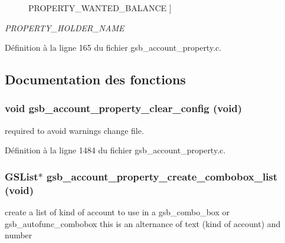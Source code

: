 \begin{Desc}
\begin{description}
{PROPERTY\_\-WANTED\_\-BALANCE\label{gsb__account__property_8c_a06dbc3a3eb5aaab80edf32ea607f1ef3a07534083ef68b1ae406ae1cfb89716d1}
}]\item[{\em 
PROPERTY\_\-HOLDER\_\-NAME\label{gsb__account__property_8c_a06dbc3a3eb5aaab80edf32ea607f1ef3a13a654144ba76dc39a1e14a1541b31f3}
}]\end{description}
\end{Desc}



Définition à la ligne 165 du fichier gsb\_\-account\_\-property.c.



\subsection{Documentation des fonctions}
\subsubsection[{gsb\_\-account\_\-property\_\-clear\_\-config}]{\setlength{\rightskip}{0pt plus 5cm}void gsb\_\-account\_\-property\_\-clear\_\-config (void)}\label{gsb__account__property_8c_a92437e45d23b702bc6eba7e601208861}
required to avoid warnings change file. 

Définition à la ligne 1484 du fichier gsb\_\-account\_\-property.c.

\subsubsection[{gsb\_\-account\_\-property\_\-create\_\-combobox\_\-list}]{\setlength{\rightskip}{0pt plus 5cm}GSList$\ast$ gsb\_\-account\_\-property\_\-create\_\-combobox\_\-list (void)}\label{gsb__account__property_8c_ade6600516c1245dbeb1b249db4692a57}
create a list of kind of account to use in a gsb\_\-combo\_\-box or gsb\_\-autofunc\_\-combobox this is an alternance of text (kind of account) and number



